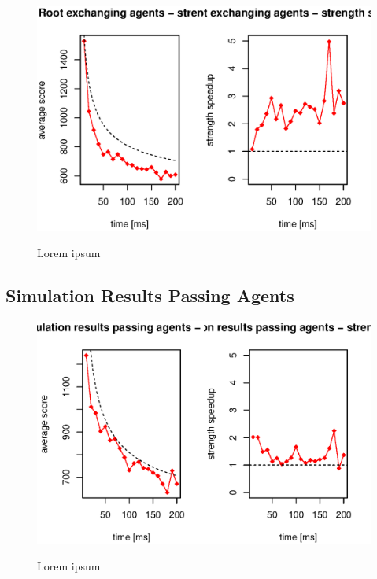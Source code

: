 \begin{figure}
\begin{center}
\includegraphics{img/root-exchange-strength.eps}
\end{center}
\caption{\footnotesize Lorem ipsum}{\footnotesize }
\label{fig_root_exchanging_strength}
\end{figure}

\subsection{Simulation Results Passing Agents}

\begin{figure}
\begin{center}
\includegraphics{img/simulation-passing-strength.eps}
\end{center}
\caption{\footnotesize Lorem ipsum}{\footnotesize }
\label{fig_simulation_passing_strength}
\end{figure}

